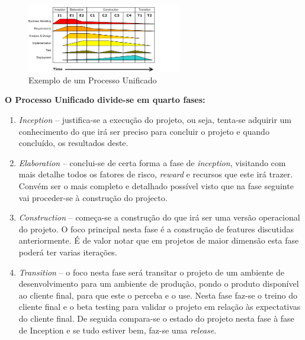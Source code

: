 \documentclass[12pt, a4paper, twoside]{report} %
\begin{document}
\begin{figure}[h!]
  \centering
	\includegraphics[width=0.6\textwidth]{image1.png}
   \caption{Exemplo de um Processo Unificado}
\end{figure}

\clearpage

\textbf{O Processo Unificado divide-se em quarto fases:}
\\

\begin{enumerate}
\item \textit{Inception} – justifica-se a execução do projeto, ou seja, tenta-se adquirir um conhecimento do que irá ser preciso para concluir o projeto e quando concluído, os resultados deste.

\item \textit{Elaboration} – conclui-se de certa forma a fase de \textit{inception}, visitando com mais detalhe todos os fatores de risco, \textit{reward} e recursos que este irá trazer. Convém ser o mais completo e detalhado possível visto que na fase seguinte vai proceder-se à construção do projecto.

\item \textit{Construction} – começa-se a construção do que irá ser uma versão operacional do projeto. O foco principal nesta fase é a construção de features discutidas anteriormente. É de valor notar que em projetos de maior dimensão esta fase poderá ter varias iterações.

\item \textit{Transition} – o foco nesta fase será transitar o projeto de um ambiente de desenvolvimento para um ambiente de produção, pondo o produto disponível ao cliente final, para que este o perceba e o use. Nesta fase faz-se o treino do cliente final e o beta testing para validar o projeto em relação às expectativas do cliente final. De seguida compara-se o estado do projeto nesta fase à fase de Inception e se tudo estiver bem, faz-se uma \textit{release}.

\end{enumerate}
\end{document}
